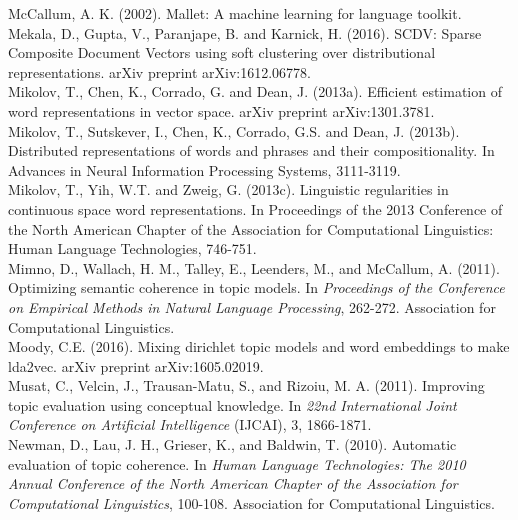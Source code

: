 \documentclass[11pt]{article}
\begin{document}
McCallum, A. K. (2002). Mallet: A machine learning for language toolkit.\\
\newline
Mekala, D., Gupta, V., Paranjape, B. and Karnick, H. (2016). SCDV: Sparse Composite Document Vectors using soft clustering over distributional representations. arXiv preprint arXiv:1612.06778.\\
\newline
Mikolov, T., Chen, K., Corrado, G. and  Dean, J. (2013a). Efficient estimation of word representations in vector space. arXiv preprint arXiv:1301.3781.\\
\newline
Mikolov, T., Sutskever, I., Chen, K., Corrado, G.S. and Dean, J. (2013b). Distributed representations of words and phrases and their compositionality. In Advances in Neural Information Processing Systems, 3111-3119.\\
\newline
Mikolov, T., Yih, W.T. and Zweig, G. (2013c). Linguistic regularities in continuous space word representations. In Proceedings of the 2013 Conference of the North American Chapter of the Association for Computational Linguistics: Human Language Technologies, 746-751.\\
\newline
Mimno, D., Wallach, H. M., Talley, E., Leenders, M., and McCallum, A. (2011). Optimizing semantic coherence in topic models. In \emph{Proceedings of the Conference on Empirical Methods in Natural Language Processing}, 262-272. Association for Computational Linguistics.\\
\newline
Moody, C.E. (2016). Mixing dirichlet topic models and word embeddings to make lda2vec. arXiv preprint arXiv:1605.02019.\\
\newline
Musat, C., Velcin, J., Trausan-Matu, S., and Rizoiu, M. A. (2011). Improving topic evaluation using conceptual knowledge. In \emph{22nd International Joint Conference on Artificial Intelligence} (IJCAI), 3, 1866-1871.\\
\newline
Newman, D., Lau, J. H., Grieser, K., and Baldwin, T. (2010). Automatic evaluation of topic coherence. In \emph{Human Language Technologies: The 2010 Annual Conference of the North American Chapter of the Association for Computational Linguistics}, 100-108. Association for Computational Linguistics.\\
\newline
\end{document}
